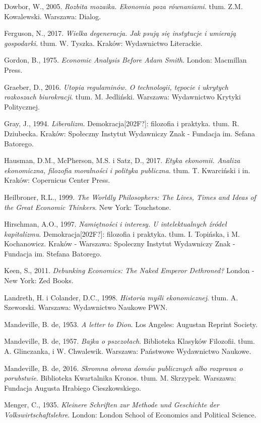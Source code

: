 \documentclass[a4paper]{article}
\begin{document}
Dowbor, W., 2005. \textit{Rozbita mozaika. Ekonomia poza równaniami}. tłum. Z.M. Kowalewski. Warszawa: Dialog.

Ferguson, N., 2017. \textit{Wielka degeneracja. Jak psują się instytucje i umierają gospodarki}. tłum. W. Tyszka.
Kraków: Wydawnictwo Literackie.

Gordon, B., 1975. \textit{Economic Analysis Before Adam Smith}. London: Macmillan Press.

Graeber, D., 2016. \textit{Utopia regulaminów. O technologii, tępocie i ukrytych rozkoszach biurokracji}. tłum. M.
Jedliński. Warszawa: Wydawnictwo Krytyki Politycznej.

Gray, J., 1994. \textit{Liberalizm}. Demokracja[202F?]: filozofia i praktyka. tłum. R. Dziubecka. Kraków: Społeczny
Instytut Wydawniczy Znak - Fundacja im. Sefana Batorego.

Hausman, D.M., McPherson, M.S. i Satz, D., 2017. \textit{Etyka ekonomii. Analiza ekonomiczna, filozofia moralności i
polityka publiczna}. tłum. T. Kwarciński i in. Kraków: Copernicus Center Press.

Heilbroner, R.L., 1999. \textit{The Worldly Philosophers: The Lives, Times and Ideas of the Great Economic Thinkers}.
New York: Touchstone.

Hirschman, A.O., 1997. \textit{Namiętności i interesy. U intelektualnych źródeł kapitalizmu}. Demokracja[202F?]:
filozofia i praktyka. tłum. I. Topińska, i M. Kochanowicz. Kraków - Warszawa: Spoleczny Instytut Wydawniczy Znak -
Fundacja im. Stefana Batorego.

Keen, S., 2011. \textit{Debunking Economics: The Naked Emperor Dethroned?} London - New York: Zed Books.

Landreth, H. i Colander, D.C., 1998. \textit{Historia myśli ekonomicznej}. tłum. A. Szeworski. Warszawa: Wydawnictwo
Naukowe PWN.

Mandeville, B. de, 1953. \textit{A letter to Dion}. Los Angeles: Augustan Reprint Society.

Mandeville, B. de, 1957. \textit{Bajka o pszczołach}. Biblioteka Klasyków Filozofii. tłum. A. Glinczanka, i W.
Chwalewik. Warszawa: Państwowe Wydawnictwo Naukowe.

Mandeville, B. de, 2016. \textit{Skromna obrona domów publicznych albo rozprawa o porubstwie}. Biblioteka Kwartalnika
Kronos. tłum. M. Skrzypek. Warszawa: Fundacja Augusta Hrabiego Cieszkowskiego.

Menger, C., 1935. \textit{Kleinere Schriften zur Methode und Geschichte der Volkswirtschaftslehre}. London: London
School of Economics and Political Science.
\end{document}
